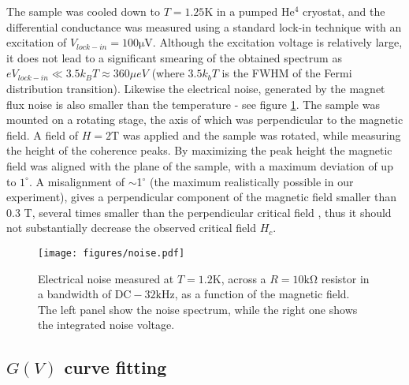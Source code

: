 \documentclass[showpacs,superscriptaddress,onecolumn,prb]{revtex4}
\begin{document}
The sample was cooled down to $T=1.25\mathrm{K}$ in a pumped $\mathrm{He^4}$ cryostat, and the differential conductance was measured using a standard lock-in technique with an excitation of $V_{lock-in}=100\mathrm{\mu V}$. Although the excitation voltage is relatively large, it does not lead to a significant smearing of the obtained spectrum as $eV_{lock-in}\ll3.5k_B T \approx 360\mu eV$ (where $3.5k_b T$ is the FWHM of the Fermi distribution transition). Likewise the electrical noise, generated by the magnet flux noise is also smaller than the temperature - see figure \ref{fig:noise}. The sample was mounted on a rotating stage, the axis of which was perpendicular to the magnetic field. A field of $H=2\mathrm{T}$ was applied and the sample was rotated, while measuring the height of the coherence peaks. By maximizing the peak height the magnetic field was aligned with the plane of the sample, with a maximum deviation of up to $1^\circ$. A misalignment of $\sim$1$^\circ$ (the maximum realistically  possible in our experiment), gives a perpendicular component of the magnetic field smaller than 0.3 T, several times smaller than the perpendicular critical field \cite{tsen2016,haim2020signatures}, thus it should not substantially decrease the observed critical field $H_c$.

\begin{figure}[h]
	\centering
	\texttt{[image: figures/noise.pdf]}
	\caption{Electrical noise measured at $T=1.2\mathrm{K}$, across  a $R=10\mathrm{k \Omega}$ resistor in a bandwidth of $\mathrm{DC}-32\mathrm{kHz}$, as a function of the magnetic field. The left panel show the noise spectrum, while the right one shows the integrated noise voltage.
	}
	\label{fig:noise}
\end{figure}

\subsection{$G(V)$ curve fitting}\label{partI:GV}
\end{document}
